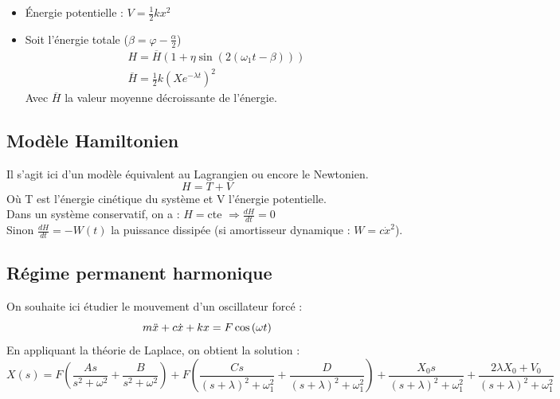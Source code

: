 \documentclass[../main.tex]{subfiles}
\begin{document}
\begin{itemize}
\begin{itemize}
        \item Énergie potentielle : $V = \frac{1}{2}kx^2$\\
        \item Soit l'énergie totale ($\beta = \varphi - \frac{\alpha}{2}$) \begin{equation}
            \begin{gathered}
                H = \overline{H} (1+\eta \sin(2(\omega_1 t-\beta)))\\
                \overline{H} = \frac{1}{2} k (X e^{-\lambda t})^2
            \end{gathered}
        \end{equation}
        Avec $\overline{H}$ la valeur moyenne décroissante de l'énergie. 
    \end{itemize}
\end{itemize}


\subsection{Modèle Hamiltonien}
Il s'agit ici d'un modèle équivalent au Lagrangien ou encore le Newtonien.\\

\begin{equation}
    H = T + V
\end{equation}
Où T est l'énergie cinétique du système et V l'énergie potentielle.\\

Dans un système conservatif, on a : $H = $cte $\Rightarrow \frac{dH}{dt} = 0$\\
Sinon $\frac{dH}{dt} = -W(t)$ la puissance dissipée (si amortisseur dynamique : $W = c \dot{x}^2$).\\

\subsection{Régime permanent harmonique}
On souhaite ici étudier le mouvement d'un oscillateur forcé : \begin{equation}
    m \Ddot{x} + c\dot{x} + kx = F \cos{(\omega t)}
\end{equation}
En appliquant la théorie de Laplace, on obtient la solution : \begin{equation}
    X(s) = F(\frac{As}{s^2+\omega^2} + \frac{B}{s^2 + \omega^2}) + F(\frac{Cs}{(s+\lambda)^2+\omega_1^2} + \frac{D}{(s+\lambda)^2+\omega_1^2}) + \frac{X_0 s}{(s+\lambda)^2+\omega_1^2} + \frac{2\lambda X_0 + V_0}{(s+\lambda)^2+\omega_1^2}
\end{equation}
\end{document}
